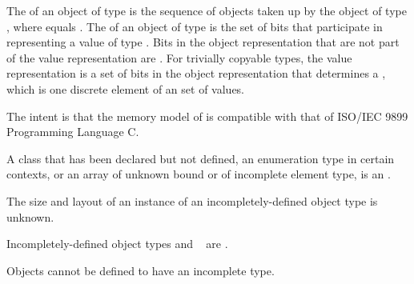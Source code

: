 \pnum
The 
of an object of type  is the
sequence of   objects taken up
by the object of type , where  equals
.
The 
of an object of type  is the set of bits
that participate in representing a value of type .
Bits in the object representation that are not part of the value representation
are .
For trivially copyable types, the value representation is
a set of bits in the object representation that determines a
, which is one discrete element of an
 set of values.
\begin{footnote}
The
intent is that the memory model of \Cpp{} is compatible
with that of ISO/IEC 9899 Programming Language C.
\end{footnote}

\pnum
{}%
A class that has been declared but not defined, an enumeration type in certain
contexts, or an array of unknown
bound or of incomplete element type, is an
.
\begin{footnote}
The size and layout of an instance of an incompletely-defined
object type is unknown.
\end{footnote}
Incompletely-defined object types and \cv{}~ are
.
\begin{note}
Objects cannot be defined to have an incomplete type.
\end{note}

